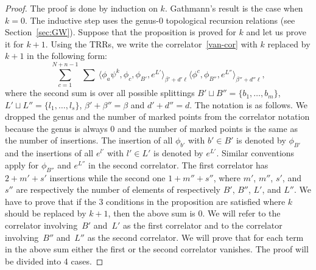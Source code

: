 \documentclass[pdftex]{sigma}
\numberwithin{equation}{section}
\begin{document}
\begin{proof}
The proof is done by induction on $k$. Gathmann's result is the case
when $k=0$. The inductive step uses the genus-0 topological recursion
relations (see Section~\ref{sec:GW}). Suppose that the proposition is
proved for $k$ and let us prove it for $k+1$. Using the TRRs, we write
the correlator~\eqref{van-cor} with $k$ replaced by $k+1$ in the
following form:
\[
\sum_{c=1}^{N+n-1}\ \sum\
\big\langle \phi_a\psi^k, \phi_c,\phi_{B'}, e^{L'}\big\rangle_{\beta'+d'\ell}
\big\langle \phi^c, \phi_{B''}, e^{L''}\big\rangle_{\beta''+d''\ell},
\]
where the second sum is over all possible splittings $B'\sqcup B''=\{b_1,\dots,b_m\}$,
$L'\sqcup L''=\{l_1,\dots,l_s\}$, $\beta'+\beta''=\beta$ and $d'+d''=d$. The notation is as
follows. We dropped the genus and the number of marked points from the correlator
notation because the genus is always $0$ and the number of marked
points is the same as the
number of insertions. The insertion of all
$\phi_{b'}$ with $b'\in B'$ is denoted by $\phi_{B'}$ and the
insertions of all $e^{l'}$ with $l'\in L'$ is denoted by
$e^{L'}$. Similar conventions apply for $\phi_{B''}$ and
$e^{L''}$ in the second correlator. The first correlator has $2+m'+s'$ insertions while
the second one $1+m''+s''$, where $m'$, $m''$, $s'$, and $s''$ are
respectively the number of elements
of respectively $B'$, $B''$, $L'$, and $L''$. We have to prove that if
the 3 conditions in the proposition
are satisfied where $k$ should be replaced by $k+1$, then the above
sum is $0$. We will refer to the correlator involving~$B'$ and~$L'$ as
the first correlator and to the correlator involving~$B''$ and~$L''$
as the second correlator. We will prove that for each term in the
above sum either the first or the second correlator vanishes. The
proof will be divided into 4 cases.


\end{proof}
\end{document}
